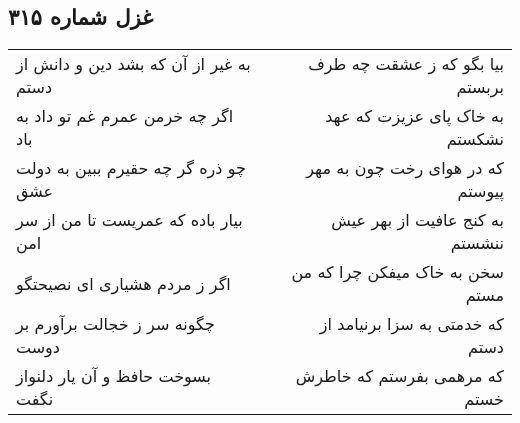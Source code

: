 \begin{center}
\section*{غزل شماره ۳۱۵}
\label{sec:sh315}
\begin{longtable}{l p{0.5cm} r}
به غیر از آن که بشد دین و دانش از دستم
&&
بیا بگو که ز عشقت چه طرف بربستم
\\
اگر چه خرمن عمرم غم تو داد به باد
&&
به خاک پای عزیزت که عهد نشکستم
\\
چو ذره گر چه حقیرم ببین به دولت عشق
&&
که در هوای رخت چون به مهر پیوستم
\\
بیار باده که عمریست تا من از سر امن
&&
به کنج عافیت از بهر عیش ننشستم
\\
اگر ز مردم هشیاری ای نصیحتگو
&&
سخن به خاک میفکن چرا که من مستم
\\
چگونه سر ز خجالت برآورم بر دوست
&&
که خدمتی به سزا برنیامد از دستم
\\
بسوخت حافظ و آن یار دلنواز نگفت
&&
که مرهمی بفرستم که خاطرش خستم
\\
\end{longtable}
\end{center}
